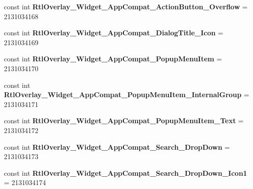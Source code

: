 \begin{DoxyCompactItemize}
\item 
\hypertarget{classClient_1_1Droid_1_1Resource_1_1Style_a0d9347efe34e5691ec67726f78ed49af}{}const int {\bfseries Rtl\+Overlay\+\_\+\+Widget\+\_\+\+App\+Compat\+\_\+\+Action\+Button\+\_\+\+Overflow} = 2131034168\label{classClient_1_1Droid_1_1Resource_1_1Style_a0d9347efe34e5691ec67726f78ed49af}

\item 
\hypertarget{classClient_1_1Droid_1_1Resource_1_1Style_a67ccd0990b4e3b169d1f4474d65966b1}{}const int {\bfseries Rtl\+Overlay\+\_\+\+Widget\+\_\+\+App\+Compat\+\_\+\+Dialog\+Title\+\_\+\+Icon} = 2131034169\label{classClient_1_1Droid_1_1Resource_1_1Style_a67ccd0990b4e3b169d1f4474d65966b1}

\item 
\hypertarget{classClient_1_1Droid_1_1Resource_1_1Style_a6c547f37d76085faab34ac22915e7389}{}const int {\bfseries Rtl\+Overlay\+\_\+\+Widget\+\_\+\+App\+Compat\+\_\+\+Popup\+Menu\+Item} = 2131034170\label{classClient_1_1Droid_1_1Resource_1_1Style_a6c547f37d76085faab34ac22915e7389}

\item 
\hypertarget{classClient_1_1Droid_1_1Resource_1_1Style_a23d7355b7eeeffb6a423ac95d2fb337b}{}const int {\bfseries Rtl\+Overlay\+\_\+\+Widget\+\_\+\+App\+Compat\+\_\+\+Popup\+Menu\+Item\+\_\+\+Internal\+Group} = 2131034171\label{classClient_1_1Droid_1_1Resource_1_1Style_a23d7355b7eeeffb6a423ac95d2fb337b}

\item 
\hypertarget{classClient_1_1Droid_1_1Resource_1_1Style_a2907b9782e2aee39984f866797a245c3}{}const int {\bfseries Rtl\+Overlay\+\_\+\+Widget\+\_\+\+App\+Compat\+\_\+\+Popup\+Menu\+Item\+\_\+\+Text} = 2131034172\label{classClient_1_1Droid_1_1Resource_1_1Style_a2907b9782e2aee39984f866797a245c3}

\item 
\hypertarget{classClient_1_1Droid_1_1Resource_1_1Style_a556305a5d3ffd3f210d3c90758ac6d9c}{}const int {\bfseries Rtl\+Overlay\+\_\+\+Widget\+\_\+\+App\+Compat\+\_\+\+Search\+\_\+\+Drop\+Down} = 2131034173\label{classClient_1_1Droid_1_1Resource_1_1Style_a556305a5d3ffd3f210d3c90758ac6d9c}

\item 
\hypertarget{classClient_1_1Droid_1_1Resource_1_1Style_a1bf3193aaed437d639e0d269fcedbcfb}{}const int {\bfseries Rtl\+Overlay\+\_\+\+Widget\+\_\+\+App\+Compat\+\_\+\+Search\+\_\+\+Drop\+Down\+\_\+\+Icon1} = 2131034174\label{classClient_1_1Droid_1_1Resource_1_1Style_a1bf3193aaed437d639e0d269fcedbcfb}


\end{DoxyCompactItemize}
